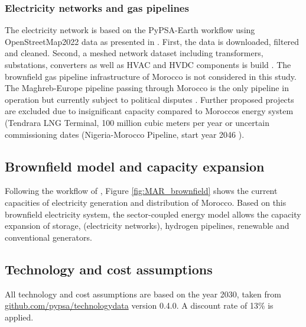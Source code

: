 \subsubsection{Electricity networks and gas pipelines}
The electricity network is based on the PyPSA-Earth workflow using OpenStreetMap2022 data \cite{OpenStreetMap2022} as presented in \cite{Parzen2023}. First, the data is downloaded, filtered and cleaned. Second, a meshed network dataset including transformers, substations, converters as well as HVAC and HVDC components is build \cite{Parzen2023}. 
The brownfield gas pipeline infrastructure of Morocco is not considered in this study. The Maghreb-Europe pipeline passing through Morocco is the only pipeline in operation but currently subject to political disputes \cite{Rachidi2022}. Further proposed projects are excluded due to insignificant capacity compared to Moroccos energy system (Tendrara LNG Terminal, 100 million cubic meters per year %
 or uncertain commissioning dates (Nigeria-Morocco Pipeline, start year 2046 \cite{GEM2023b}).


\subsection{Brownfield model and capacity expansion}
\label{brownfield_model}
Following the workflow of \cite{Parzen2023}, Figure \ref{fig:MAR_brownfield} shows the current capacities of electricity generation and distribution of Morocco. Based on this brownfield electricity system, the sector-coupled energy model allows the capacity expansion of storage, (electricity networks), hydrogen pipelines, renewable and conventional generators.

\subsection{Technology and cost assumptions}
\label{subsec:tech_assump}
All technology and cost assumptions are based on the year 2030, taken from \href{https://github.com/pypsa/technologydata}{github.com/pypsa/technologydata} version 0.4.0. A discount rate of 13\% is applied.


